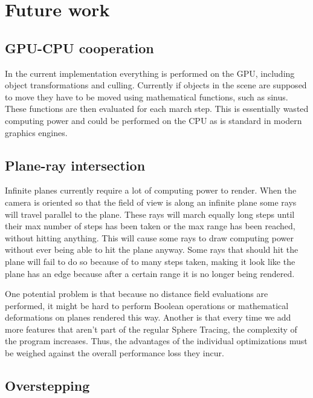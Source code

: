 	\section{Future work}

		\subsection{GPU-CPU cooperation}

			In the current implementation everything is performed on the GPU,
			including object transformations and culling. Currently if objects in the
			scene are supposed to move they have to be moved using mathematical
			functions, such as sinus. These functions are then evaluated for each
			march step. This is essentially wasted computing power and could be
			performed on the CPU as is standard in modern graphics engines.

		\subsection{Plane-ray intersection}

			Infinite planes currently require a lot of computing power to
			render. When the camera is oriented so that the field of view is
			along an infinite plane some rays will travel parallel to the
			plane. These rays will march equally long steps until their max
			number of steps has been taken or the max range has been reached, 
			without hitting anything. This will cause some rays to draw 
			computing power without ever being able to hit the plane anyway. 
			Some rays that should hit the plane will fail to do so because of 
			to many steps taken, making it look like the plane has an edge 
			because after a certain range it is no longer being rendered.

			One potential problem is that because no distance field evaluations 
			are performed, it might be hard to perform Boolean operations or 
			mathematical deformations on planes rendered this way. Another is 
			that every time we add more features that aren't part of the 
			regular Sphere Tracing, the complexity of the program increases. 
			Thus, the advantages of the individual optimizations must be 
			weighed against the overall performance loss they incur. 

		\subsection{Overstepping}


